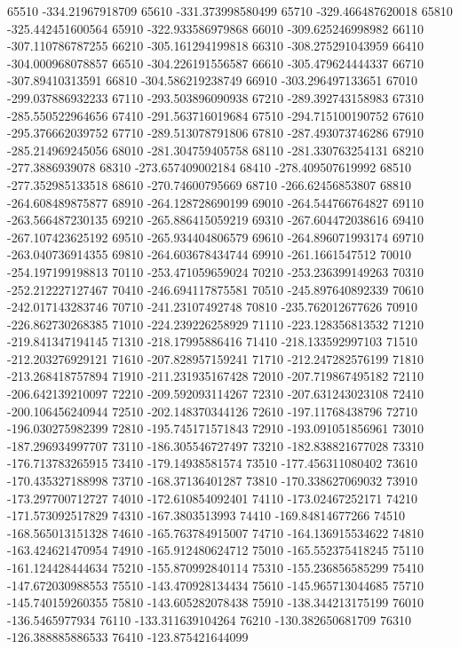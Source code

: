 {65510 -334.21967918709
65610 -331.373998580499
65710 -329.466487620018
65810 -325.442451600564
65910 -322.933586979868
66010 -309.625246998982
66110 -307.110786787255
66210 -305.161294199818
66310 -308.275291043959
66410 -304.000968078857
66510 -304.226191556587
66610 -305.479624444337
66710 -307.89410313591
66810 -304.586219238749
66910 -303.296497133651
67010 -299.037886932233
67110 -293.503896090938
67210 -289.392743158983
67310 -285.550522964656
67410 -291.563716019684
67510 -294.715100190752
67610 -295.376662039752
67710 -289.513078791806
67810 -287.493073746286
67910 -285.214969245056
68010 -281.304759405758
68110 -281.330763254131
68210 -277.3886939078
68310 -273.657409002184
68410 -278.409507619992
68510 -277.352985133518
68610 -270.74600795669
68710 -266.62456853807
68810 -264.608489875877
68910 -264.128728690199
69010 -264.544766764827
69110 -263.566487230135
69210 -265.886415059219
69310 -267.604472038616
69410 -267.107423625192
69510 -265.934404806579
69610 -264.896071993174
69710 -263.040736914355
69810 -264.603678434744
69910 -261.1661547512
70010 -254.197199198813
70110 -253.471059659024
70210 -253.236399149263
70310 -252.212227127467
70410 -246.694117875581
70510 -245.897640892339
70610 -242.017143283746
70710 -241.23107492748
70810 -235.762012677626
70910 -226.862730268385
71010 -224.239226258929
71110 -223.128356813532
71210 -219.841347194145
71310 -218.17995886416
71410 -218.133592997103
71510 -212.203276929121
71610 -207.828957159241
71710 -212.247282576199
71810 -213.268418757894
71910 -211.231935167428
72010 -207.719867495182
72110 -206.642139210097
72210 -209.592093114267
72310 -207.631243023108
72410 -200.106456240944
72510 -202.148370344126
72610 -197.11768438796
72710 -196.030275982399
72810 -195.745171571843
72910 -193.091051856961
73010 -187.296934997707
73110 -186.305546727497
73210 -182.838821677028
73310 -176.713783265915
73410 -179.14938581574
73510 -177.456311080402
73610 -170.435327188998
73710 -168.37136401287
73810 -170.338627069032
73910 -173.297700712727
74010 -172.610854092401
74110 -173.02467252171
74210 -171.573092517829
74310 -167.3803513993
74410 -169.84814677266
74510 -168.565013151328
74610 -165.763784915007
74710 -164.136915534622
74810 -163.424621470954
74910 -165.912480624712
75010 -165.552375418245
75110 -161.124428444634
75210 -155.870992840114
75310 -155.236856585299
75410 -147.672030988553
75510 -143.470928134434
75610 -145.965713044685
75710 -145.740159260355
75810 -143.605282078438
75910 -138.344213175199
76010 -136.5465977934
76110 -133.311639104264
76210 -130.382650681709
76310 -126.388885886533
76410 -123.875421644099
}
